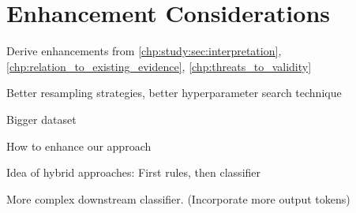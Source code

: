 \chapter{Enhancement Considerations}
\label{chp:enhancement_considerations}
Derive enhancements from \cref{chp:study:sec:interpretation}, \cref{chp:relation_to_existing_evidence}, \cref{chp:threats_to_validity}

Better resampling strategies, better hyperparameter search technique

Bigger dataset

How to enhance our approach

Idea of hybrid approaches: First rules, then classifier

More complex downstream classifier. (Incorporate more output tokens)


